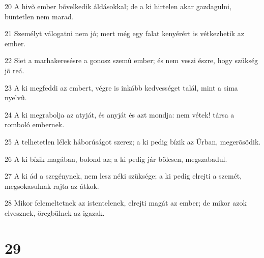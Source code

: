 \par 20 A hivõ ember bõvelkedik áldásokkal; de a ki hirtelen akar gazdagulni, büntetlen nem marad.
\par 21 Személyt válogatni nem jó; mert még egy falat kenyérért is vétkezhetik az ember.
\par 22 Siet a marhakeresésre a gonosz szemû ember; és nem veszi észre, hogy szükség jõ reá.
\par 23 A ki megfeddi az embert, végre is inkább kedvességet talál, mint a sima nyelvû.
\par 24 A ki megrabolja az atyját, és anyját és azt mondja: nem vétek! társa a romboló embernek.
\par 25 A telhetetlen lélek háborúságot szerez; a ki pedig bízik az Úrban, megerõsödik.
\par 26 A ki bízik magában, bolond az; a ki pedig jár bölcsen, megszabadul.
\par 27 A ki ád a szegénynek, nem lesz néki szüksége; a ki pedig elrejti a szemét, megsokasulnak rajta az átkok.
\par 28 Mikor felemeltetnek az istentelenek, elrejti magát az ember; de mikor azok elvesznek,  öregbülnek az igazak.

\chapter{29}


